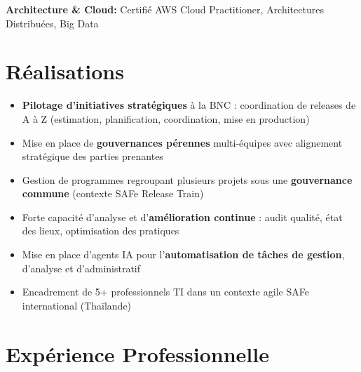 \documentclass[11pt,a4paper]{article}
\begin{document}
\textbf{Architecture \& Cloud:} Certifié AWS Cloud Practitioner, Architectures Distribuées, Big Data

\vspace{6pt}

\section*{Réalisations}
\begin{itemize}
    \item \textbf{Pilotage d'initiatives stratégiques} à la BNC : coordination de releases de A à Z (estimation, planification, coordination, mise en production)
    \item Mise en place de \textbf{gouvernances pérennes} multi-équipes avec alignement stratégique des parties prenantes
    \item Gestion de programmes regroupant plusieurs projets sous une \textbf{gouvernance commune} (contexte SAFe Release Train)
    \item Forte capacité d'analyse et d'\textbf{amélioration continue} : audit qualité, état des lieux, optimisation des pratiques
    \item Mise en place d'agents IA pour l'\textbf{automatisation de tâches de gestion}, d'analyse et d'administratif
    \item Encadrement de 5+ professionnels TI dans un contexte agile SAFe international (Thaïlande)
\end{itemize}

\section*{Expérience Professionnelle}
\end{document}
